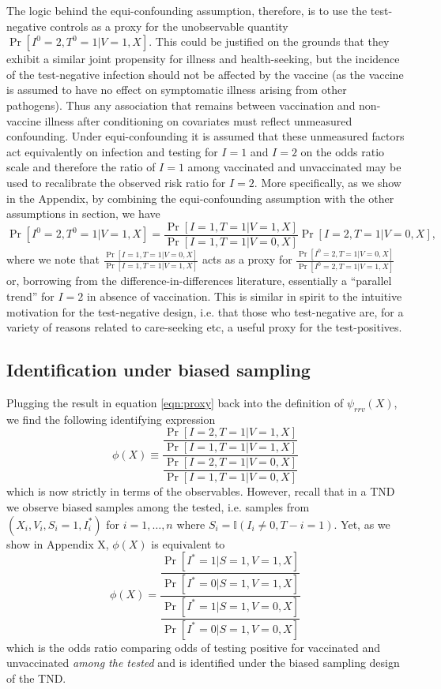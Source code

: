 \documentclass[11pt]{article}
\begin{document}
The logic behind the equi-confounding assumption, therefore, is to use the test-negative controls as a proxy for the unobservable quantity $\Pr[I^0 = 2, T^0 = 1 | V = 1, X]$. This could be justified on the grounds that they exhibit a similar joint propensity for illness and health-seeking, but the incidence of the test-negative infection should not be affected by the vaccine (as the vaccine is assumed to have no effect on symptomatic illness arising from other pathogens). Thus any association that remains between vaccination and non-vaccine illness after conditioning on covariates must reflect unmeasured confounding. Under equi-confounding it is assumed that these unmeasured factors act equivalently on infection and testing for $I=1$ and $I=2$ on the odds ratio scale and therefore the ratio of $I=1$ among vaccinated and unvaccinated may be used to recalibrate the observed risk ratio for $I = 2$. More specifically, as we show in the Appendix, by combining the equi-confounding assumption with the other assumptions in section, we have
    \begin{equation}\label{eqn:proxy}
     \Pr[I^0 = 2, T^0 = 1  | V = 1, X] = \frac{\Pr[I = 1, T = 1  | V = 1, X]}{\Pr[I = 1, T = 1  | V = 0, X]}\Pr[I = 2, T = 1 | V = 0, X],
    \end{equation}
where we note that $\frac{\Pr[I = 1, T =1  | V = 0, X]}{\Pr[I = 1, T = 1 | V = 1, X]}$ acts as a proxy for $\frac{\Pr[I^0 = 2, T =1  | V = 0, X]}{\Pr[I^0 = 2, T = 1 | V = 1, X]}$ or, borrowing from the difference-in-differences literature, essentially a ``parallel trend'' for $I=2$ in absence of vaccination. This is similar in spirit to the intuitive motivation for the test-negative design, i.e. that those who test-negative are, for a variety of reasons related to care-seeking etc, a useful proxy for the test-positives.

\subsection{Identification under biased sampling}
Plugging the result in equation \ref{eqn:proxy} back into the definition of $\psi_{rrv}(X)$, we find the following identifying expression 
    \begin{equation*}
         \phi(X) \equiv \dfrac{\dfrac{\Pr[I = 2, T = 1 | V = 1, X]}{\Pr[I = 1, T = 1 | V = 1, X]}}{\dfrac{\Pr[I = 2, T = 1 | V = 0, X]}{\Pr[I = 1, T = 1 | V = 0, X]}}
    \end{equation*}
which is now strictly in terms of the observables. However, recall that in a TND we observe biased samples among the tested, i.e. samples from $(X_i, V_i, S_i = 1, I^*_i)$ for $i = 1, \ldots, n$ where $S_i = \mathbb{I}(I_i \neq 0, T-i = 1)$. Yet, as we show in Appendix X, $\phi(X)$ is equivalent to 
    \begin{equation}
         \phi(X) = \dfrac{\dfrac{\Pr[I^* = 1 | S = 1, V = 1, X]}{\Pr[I^* = 0 | S = 1, V = 1, X]}}{\dfrac{\Pr[I^* = 1 | S = 1, V = 0, X]}{\Pr[I^* = 0 | S = 1, V = 0, X]}}
    \end{equation}    
which is the odds ratio comparing odds of testing positive for vaccinated and unvaccinated \textit{among the tested} and is identified under the biased sampling design of the TND.
\end{document}
